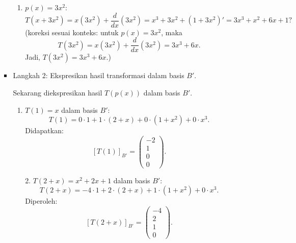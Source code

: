\documentclass[11pt,letterpaper]{article}
\begin{document}
\begin{enumerate}
\begin{enumerate}
\begin{itemize}
\begin{enumerate}
                          \item $p(x) = 3x^2$:
                                \[
                                  T(x+3x^2) = x(3x^2) + \frac{d}{dx}(3x^2) = x^3 + 3x^2 + (1 + 3x^2)' = 3x^3 + x^2 + 6x + 1?
                                \]
                                (koreksi sesuai konteks: untuk $p(x)=3x^2$, maka
                                \[
                                  T(3x^2) = x(3x^2) + \frac{d}{dx}(3x^2) = 3x^3 + 6x.
                                \]
                                Jadi, $T(3x^2) = 3x^3 + 6x$.)
                        \end{enumerate}
                  \item Langkah 2: Ekspresikan hasil transformasi dalam basis $B'$.

                        Sekarang diekspresikan hasil $T(p(x))$ dalam basis $B'$.

                        \begin{enumerate}
                          \item $T(1) = x$ dalam basis $B'$:
                                \[
                                  T(1) = 0 \cdot 1 + 1 \cdot (2+x) + 0 \cdot (1+x^2) + 0 \cdot x^3.
                                \]
                                Didapatkan:
                                \[
                                  [T(1)]_{B'} =
                                  \begin{pmatrix}
                                    -2 \\ 1 \\ 0 \\ 0
                                  \end{pmatrix}.
                                \]

                                2. $T(2+x) = x^2 + 2x + 1$ dalam basis $B'$:
                                \[
                                  T(2+x) = -4 \cdot 1 + 2 \cdot (2+x) + 1 \cdot (1+x^2) + 0 \cdot x^3.
                                \]
                                Diperoleh:
                                \[
                                  [T(2+x)]_{B'} =
                                  \begin{pmatrix}
                                    -4 \\ 2 \\ 1 \\ 0
                                  \end{pmatrix}.
                                \]


\end{enumerate}
\end{itemize}
\end{enumerate}
\end{enumerate}
\end{document}
